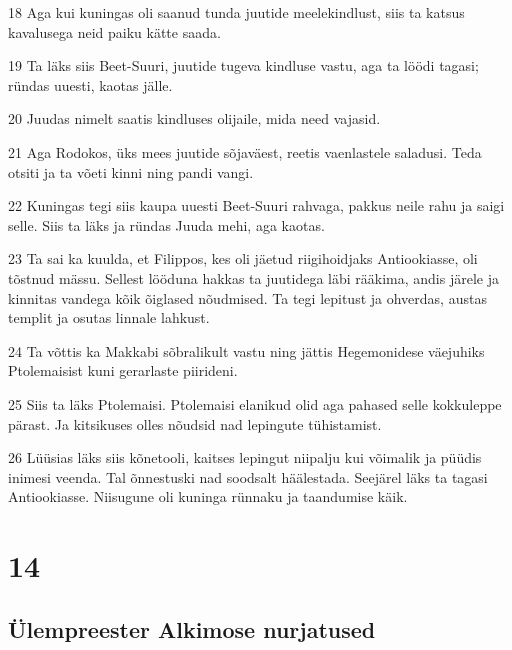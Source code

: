 \par 18 Aga kui kuningas oli saanud tunda juutide meelekindlust, siis ta katsus kavalusega neid paiku kätte saada.
\par 19 Ta läks siis Beet-Suuri, juutide tugeva kindluse vastu, aga ta löödi tagasi; ründas uuesti, kaotas jälle.
\par 20 Juudas nimelt saatis kindluses olijaile, mida need vajasid.
\par 21 Aga Rodokos, üks mees juutide sõjaväest, reetis vaenlastele saladusi. Teda otsiti ja ta võeti kinni ning pandi vangi.
\par 22 Kuningas tegi siis kaupa uuesti Beet-Suuri rahvaga, pakkus neile rahu ja saigi selle. Siis ta läks ja ründas Juuda mehi, aga kaotas.
\par 23 Ta sai ka kuulda, et Filippos, kes oli jäetud riigihoidjaks Antiookiasse, oli tõstnud mässu. Sellest lööduna hakkas ta juutidega läbi rääkima, andis järele ja kinnitas vandega kõik õiglased nõudmised. Ta tegi lepitust ja ohverdas, austas templit ja osutas linnale lahkust.
\par 24 Ta võttis ka Makkabi sõbralikult vastu ning jättis Hegemonidese väejuhiks Ptolemaisist kuni gerarlaste piirideni.
\par 25 Siis ta läks Ptolemaisi. Ptolemaisi elanikud olid aga pahased selle kokkuleppe pärast. Ja kitsikuses olles nõudsid nad lepingute tühistamist.
\par 26 Lüüsias läks siis kõnetooli, kaitses lepingut niipalju kui võimalik ja püüdis inimesi veenda. Tal õnnestuski nad soodsalt häälestada. Seejärel läks ta tagasi Antiookiasse. Niisugune oli kuninga rünnaku ja taandumise käik.



\chapter{14}


\section*{Ülempreester Alkimose nurjatused}

